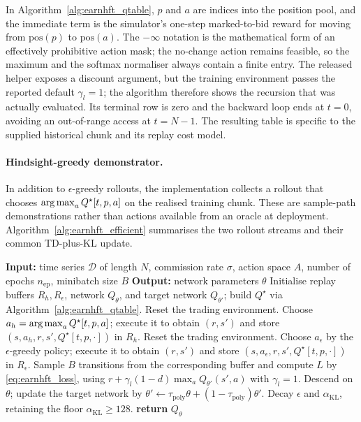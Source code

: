 In Algorithm~\ref{alg:earnhft_qtable}, $p$ and $a$ are indices into the position pool, and the immediate term is the simulator's one-step marked-to-bid reward for moving from $\mathrm{pos}(p)$ to $\mathrm{pos}(a)$. The $-\infty$ notation is the mathematical form of an effectively prohibitive action mask; the no-change action remains feasible, so the maximum and the softmax normaliser always contain a finite entry. The released helper exposes a discount argument, but the training environment passes the reported default $\gamma_l=1$; the algorithm therefore shows the recursion that was actually evaluated. Its terminal row is zero and the backward loop ends at $t=0$, avoiding an out-of-range access at $t=N-1$. The resulting table is specific to the supplied historical chunk and its replay cost model.

\paragraph{Hindsight-greedy demonstrator.} In addition to $\epsilon$-greedy rollouts, the implementation collects a rollout that chooses $\operatorname*{arg\,max}_a Q^\star[t,p,a]$ on the realised training chunk. These are sample-path demonstrations rather than actions available from an oracle at deployment. Algorithm~\ref{alg:earnhft_efficient} summarises the two rollout streams and their common TD-plus-KL update.

\begin{algorithm}[!htb]
\caption{Efficient Reinforcement Learning with a Q-Teacher}
\label{alg:earnhft_efficient}
\begin{algorithmic}[1]
\State \textbf{Input:} time series $\mathcal{D}$ of length $N$, commission rate $\sigma$, action space $A$, number of epochs $n_{\mathrm{ep}}$, minibatch size $B$
\State \textbf{Output:} network parameters $\theta$
\State Initialise replay buffers $R_h,R_\epsilon$, network $Q_\theta$, and target network $Q_{\theta'}$; build $Q^\star$ via Algorithm~\ref{alg:earnhft_qtable}.
  \State Reset the trading environment.
   
    \State Choose $a_h=\operatorname*{arg\,max}_a Q^\star[t,p,a]$; execute it to obtain $(r,s')$ and store $(s,a_h,r,s',Q^\star[t,p,\cdot])$ in $R_h$.
  \EndFor
  \State Reset the trading environment.
   
    \State Choose $a_\epsilon$ by the $\epsilon$-greedy policy; execute it to obtain $(r,s')$ and store $(s,a_\epsilon,r,s',Q^\star[t,p,\cdot])$ in $R_\epsilon$.
  \EndFor
    \State Sample $B$ transitions from the corresponding buffer and compute $L$ by \eqref{eq:earnhft_loss}, using $r+\gamma_l(1-d)\max_a Q_{\theta'}(s',a)$ with $\gamma_l=1$.
    \State Descend on $\theta$; update the target network by $\theta'\gets\tau_{\mathrm{poly}}\theta+(1-\tau_{\mathrm{poly}})\theta'$.
  \EndFor
  \State Decay $\epsilon$ and $\alpha_{\mathrm{KL}}$, retaining the floor $\alpha_{\mathrm{KL}}\ge128$.
\EndFor
\State \textbf{return} $Q_\theta$
\end{algorithmic}
\end{algorithm}

